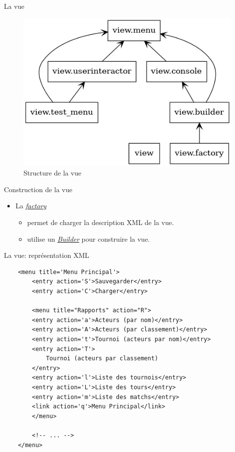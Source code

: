 \begin{frame}{La vue}
  \begin{center}
    \begin{figure}
      \includegraphics[scale=0.3]{img/view.png}
      \caption{Structure de la vue}
    \end{figure}
  \end{center}

  \begin{block}{Construction de la vue}
    \begin{itemize}
    \item La \underline{\textit{factory}}
      \begin{itemize}
      \item permet de charger la description XML de la vue.
      \item utilise un \underline{\textit{Builder}} pour construire la vue.
      \end{itemize}
    \end{itemize}
  \end{block}
\end{frame}

\begin{frame}[fragile]{La vue: représentation XML}
  \small

  \begin{verbatim}
    <menu title='Menu Principal'>
        <entry action='S'>Sauvegarder</entry>
        <entry action='C'>Charger</entry>

        <menu title="Rapports" action="R">
        <entry action='a'>Acteurs (par nom)</entry>
        <entry action='A'>Acteurs (par classement)</entry>
        <entry action='t'>Tournoi (acteurs par nom)</entry>
        <entry action='T'>
            Tournoi (acteurs par classement)
        </entry>
        <entry action='l'>Liste des tournois</entry>
        <entry action='L'>Liste des tours</entry>
        <entry action='m'>Liste des matchs</entry>
        <link action='q'>Menu Principal</link>
        </menu>

        <!-- ... -->
    </menu>
  \end{verbatim}
\end{frame}

